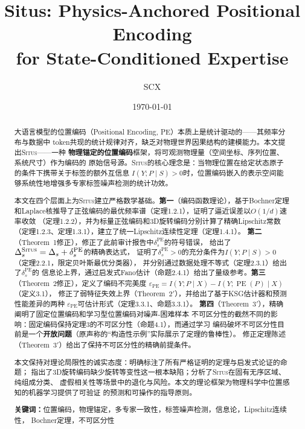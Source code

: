 \documentclass[11pt,a4paper]{article}
\title{\textbf{\LARGE Situs: Physics-Anchored Positional Encoding\\for State-Conditioned Expertise}}
\author{SCX}
\date{\today}
\theoremstyle{remark}
\DeclareMathOperator{\PE}{PE}
\newcommand{\Situs}{\textsc{Situs}}
\begin{document}
\maketitle

\begin{abstract}
大语言模型的位置编码（Positional Encoding, PE）本质上是统计驱动的——其频率分布与数据中
token共现的统计规律对齐，缺乏对物理世界因果结构的建模能力。本文提出\Situs{}——一种
\textbf{物理锚定的位置编码}框架，将可观测物理量（空间坐标、序列位置、系统尺寸）作为编码的
原始信号源。\Situs{}的核心理念是：当物理位置在给定状态原子的条件下携带关于标签的额外互信息
$I(Y; P \mid S) > 0$时，位置编码嵌入的表示空间能够系统性地增强多专家标签噪声检测的统计功效。

本文在四个层面上为\Situs{}建立严格数学基础。\textbf{第一}（编码函数理论），基于Bochner定理
和Laplace核推导了正弦编码的最优频率谱（定理1.2.1），证明了逼近误差以$O(1/d)$速率收敛
（定理1.2.2），并为标量正弦编码和3D旋转编码分别计算了精确Lipschitz常数
（定理1.2.3、定理1.3.1），建立了统一Lipschitz连续性定理（定理1.4.1）。
\textbf{第二}（Theorem~1修正），修正了此前审计报告中$\delta_s^{\PE}$的符号错误，
给出了$\Delta_s^{\Situs} = \Delta_s + \delta_s^{\PE}$的精确表达式，
证明了$\delta_s^{\PE} > 0$的充分条件为$I(Y; P \mid S) > 0$（定理2.2.1，限定贝叶斯最优分类器），
并分别通过数据处理不等式（定理2.3.1）给出了$\delta_s^{\PE}$的
信息论上界，通过启发式Fano估计（命题2.4.1）给出了量级参考。\textbf{第三}（Theorem~2修正），定义了编码不完美度
$\varepsilon_{\PE} = I(Y; P \mid X) - I(Y; \PE(P) \mid X)$（定义3.1），
修正了弱特征失效上界（Theorem~$2'$），并给出了基于KSG估计器和预测性能差异的两种
$\varepsilon_{\PE}$可估计形式（定理3.3.1、命题3.3.1）。
\textbf{第四}（Theorem~$3'$），精确阐明了固定位置编码和学习型位置编码对噪声-困难样本
不可区分性的截然不同的影响：固定编码保持定理3的不可区分性（命题4.1），而通过学习
编码破坏不可区分性目前是一个\textbf{开放问题}（原声称的``构造性示例''实际展示了定理的鲁棒性）。
修正定理陈述（Theorem~$3'$）给出了保持不可区分性的精确前提条件。

本文保持对理论局限性的诚实态度：明确标注了所有严格证明的定理与启发式论证的命题；
指出了3D旋转编码缺少旋转等变性这一根本缺陷；分析了\Situs{}在固有无序区域、纯组成分类、
虚假相关性等场景中的退化与风险。本文的理论框架为物理科学中位置感知的机器学习提供了可验证
的预测和可操作的指导原则。

\textbf{关键词：}位置编码，物理锚定，多专家一致性，标签噪声检测，信息论，Lipschitz连续性，
Bochner定理，不可区分性
\end{abstract}
\end{document}
